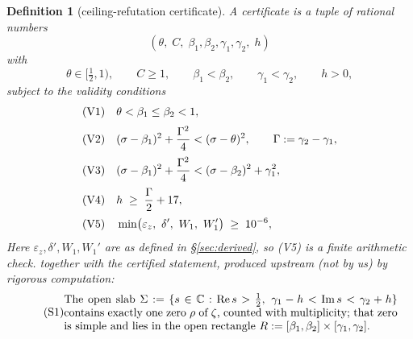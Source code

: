 \documentclass[11pt]{amsart}
\newtheorem{definition}[theorem]{Definition}
\numberwithin{equation}{section}
\newcommand{\C}{\mathbb{C}}
\newcommand{\re}{\operatorname{Re}}
\newcommand{\im}{\operatorname{Im}}
\newcommand{\Sig}{\sigma}
\begin{document}
\begin{definition}[ceiling-refutation certificate]\label{def:cert}
A \emph{certificate} is a tuple of rational numbers
\[
(\theta,\; C,\; \beta_1, \beta_2, \gamma_1, \gamma_2,\; h)
\]
with
\[
\theta \in [\tfrac12, 1), \qquad C \ge 1, \qquad
\beta_1 < \beta_2, \qquad \gamma_1 < \gamma_2, \qquad h > 0,
\]
subject to the \emph{validity conditions}
\begin{align}
\text{(V1)}&\quad \theta < \beta_1 \le \beta_2 < 1, \notag\\[2pt]
\text{(V2)}&\quad (\Sig - \beta_1)^2 + \frac{\Gamma^2}{4}
        < (\Sig - \theta)^2,
        \qquad \Gamma := \gamma_2 - \gamma_1, \notag\\[2pt]
\text{(V3)}&\quad (\Sig - \beta_1)^2 + \frac{\Gamma^2}{4}
        < (\Sig - \beta_2)^2 + \gamma_1^2, \notag\\[2pt]
\text{(V4)}&\quad h \;\ge\; \frac{\Gamma}{2} + 17, \notag\\[2pt]
\text{(V5)}&\quad \min\bigl(\varepsilon_z,\ \delta',\ W_1,\ W_1'\bigr)
\;\ge\; 10^{-6}, \notag
\end{align}
Here $\varepsilon_z, \delta', W_1, W_1'$ are as defined in
\S\ref{sec:derived}, so (V5) is a finite arithmetic check.
together with the \emph{certified statement}, produced upstream (not by
us) by rigorous computation:
\begin{equation}\tag{S1}\label{eq:S1}
\begin{minipage}{0.86\linewidth}
The open slab
$\Sigma := \{s \in \C : \re s > \tfrac12,\;
\gamma_1 - h < \im s < \gamma_2 + h\}$
contains exactly one zero $\rho$ of $\zeta$, counted with multiplicity;
that zero is simple and lies in the open rectangle
$R := [\beta_1, \beta_2] \times [\gamma_1, \gamma_2]$.
\end{minipage}
\end{equation}
\end{definition}
\end{document}
